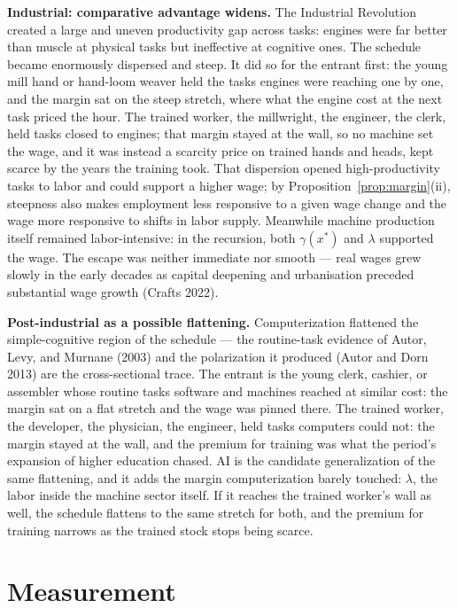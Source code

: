 \documentclass[12pt]{article}
\theoremstyle{plain}
\begin{document}
\textbf{Industrial: comparative advantage widens.} The Industrial Revolution created a large and uneven productivity gap across tasks: engines were far better than muscle at physical tasks but ineffective at cognitive ones. The schedule became enormously dispersed and steep. It did so for the entrant first: the young mill hand or hand-loom weaver held the tasks engines were reaching one by one, and the margin sat on the steep stretch, where what the engine cost at the next task priced the hour. The trained worker, the millwright, the engineer, the clerk, held tasks closed to engines; that margin stayed at the wall, so no machine set the wage, and it was instead a scarcity price on trained hands and heads, kept scarce by the years the training took. That dispersion opened high-productivity tasks to labor and could support a higher wage; by Proposition~\ref{prop:margin}(ii), steepness also makes employment less responsive to a given wage change and the wage more responsive to shifts in labor supply. Meanwhile machine production itself remained labor-intensive: in the recursion, both $\gamma (x^*)$ and $\lambda$ supported the wage. The escape was neither immediate nor smooth --- real wages grew slowly in the early decades as capital deepening and urbanisation preceded substantial wage growth (Crafts 2022).

\textbf{Post-industrial as a possible flattening.} Computerization flattened the simple-cognitive region of the schedule --- the routine-task evidence of Autor, Levy, and Murnane (2003) and the polarization it produced (Autor and Dorn 2013) are the cross-sectional trace. The entrant is the young clerk, cashier, or assembler whose routine tasks software and machines reached at similar cost: the margin sat on a flat stretch and the wage was pinned there. The trained worker, the developer, the physician, the engineer, held tasks computers could not: the margin stayed at the wall, and the premium for training was what the period's expansion of higher education chased. AI is the candidate generalization of the same flattening, and it adds the margin computerization barely touched: $\lambda$, the labor inside the machine sector itself. If it reaches the trained worker's wall as well, the schedule flattens to the same stretch for both, and the premium for training narrows as the trained stock stops being scarce. 

\section{Measurement}\label{sec:measurement}
\end{document}
